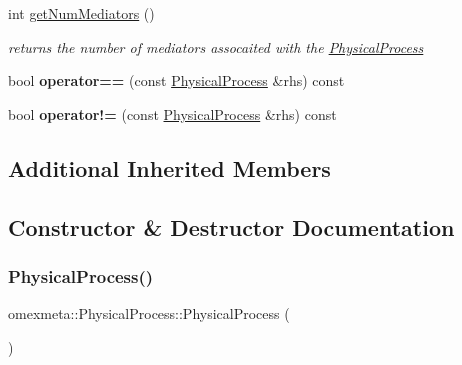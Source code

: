 \begin{DoxyCompactItemize}
int \hyperlink{classomexmeta_1_1PhysicalProcess_a717a352ce3bb956201174002f904cd26}{get\+Num\+Mediators} ()
\begin{DoxyCompactList}\small\item\em returns the number of mediators assocaited with the \hyperlink{classomexmeta_1_1PhysicalProcess}{Physical\+Process} \end{DoxyCompactList}\item 
\mbox{\label{classomexmeta_1_1PhysicalProcess_a65585bf5cd473d509f6f66c96757ff8d}} 
bool {\bfseries operator==} (const \hyperlink{classomexmeta_1_1PhysicalProcess}{Physical\+Process} \&rhs) const
\item 
\mbox{\label{classomexmeta_1_1PhysicalProcess_af8298394b713807ec51c2b5f60afd00e}} 
bool {\bfseries operator!=} (const \hyperlink{classomexmeta_1_1PhysicalProcess}{Physical\+Process} \&rhs) const
\end{DoxyCompactItemize}
\subsection*{Additional Inherited Members}


\subsection{Constructor \& Destructor Documentation}
\mbox{\label{classomexmeta_1_1PhysicalProcess_acf4c42d10d6dbdd3aa4285bed7bd823b}} 
\subsubsection{\texorpdfstring{Physical\+Process()}{PhysicalProcess()}\hspace{0.1cm}{\footnotesize\ttfamily [1/4]}}
{\footnotesize\ttfamily omexmeta\+::\+Physical\+Process\+::\+Physical\+Process (\begin{DoxyParamCaption}{ }\end{DoxyParamCaption})\hspace{0.3cm}{\ttfamily [delete]}}



